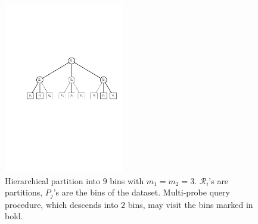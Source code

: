 \documentclass[11pt]{article}
\begin{document}
\begin{figure}
    \centering
    \includegraphics[width=0.47\textwidth]{submissions/Piotr2023/fig/tree.pdf}
    \caption{Hierarchical partition into $9$ bins with $m_1 = m_2 = 3$. $\mathcal{R}_i$'s are partitions,
    $P_j$'s are the bins of the dataset. Multi-probe query procedure, which descends into $2$ bins, may visit the bins marked in bold.}
        \label{piotr_fig:hierarchical}
\end{figure}
\end{document}
